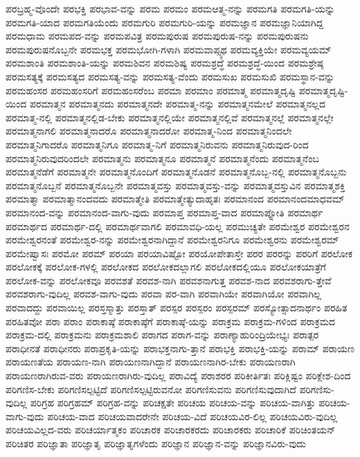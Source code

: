 {ಪರಬ್ರಹ್ಮ-ವೊಂದೇ
ಪರಭಕ್ತಿ
ಪರಭಾವ-ವನ್ನು
ಪರಮ
ಪರಮಂ
ಪರಮಆತ್ಮ-ನನ್ನು
ಪರಮಗತಿ
ಪರಮಗತಿ-ಯನ್ನು
ಪರಮಗತಿ-ಯಾದ
ಪರಮಗತಿಯೆಂದು
ಪರಮಗುರಿ
ಪರಮಗುರಿ-ಯನ್ನು
ಪರಮಜ್ಞಾನ
ಪರಮಜ್ಞಾನಿಯಾಗಿದ್ದ
ಪರಮಧಾಮ
ಪರಮಪದ-ವನ್ನು
ಪರಮಪವಿತ್ರ
ಪರಮಪುರುಷ
ಪರಮಪುರುಷ-ನನ್ನು
ಪರಮಪುರುಷನು
ಪರಮಪುರುಷನೊಬ್ಬನೇ
ಪರಮಭಕ್ತ
ಪರಮಭೋಗಿ-ಗಳಾಗಿ
ಪರಮವಾಪ್ಸ್ಯಥ
ಪರಮವ್ಯಕ್ತಿಯೇ
ಪರಮವ್ಯಯಮ್
ಪರಮಶಾಂತಿ
ಪರಮಶಾಂತಿ-ಯನ್ನು
ಪರಮಶಿವನ
ಪರಮಶಿಷ್ಯ
ಪರಮಶ್ರದ್ಧೆ
ಪರಮಶ್ರದ್ಧೆ-ಯಿಂದ
ಪರಮಶ್ರೇಷ್ಠ
ಪರಮಸತ್ಯಕ್ಕೆ
ಪರಮಸತ್ಯದ
ಪರಮಸತ್ಯ-ವನ್ನು
ಪರಮಸತ್ಯ-ವೆಂದು
ಪರಮಸುಖ
ಪರಮಸುಖಿ
ಪರಮಸ್ಥಾನ-ವನ್ನು
ಪರಮಹಂಸರ
ಪರಮಹಂಸರಿಗೆ
ಪರಮಹಂಸರೆಂಬ
ಪರಮಾ
ಪರಮಾಂ
ಪರಮಾತ್ಮ
ಪರಮಾತ್ಮದೃಷ್ಟಿ
ಪರಮಾತ್ಮದೃಷ್ಟಿ-ಯಿಂದ
ಪರಮಾತ್ಮನ
ಪರಮಾತ್ಮನದು
ಪರಮಾತ್ಮನದೇ
ಪರಮಾತ್ಮ-ನನ್ನು
ಪರಮಾತ್ಮನಮೇಲೆ
ಪರಮಾತ್ಮನಲ್ಲದ
ಪರಮಾತ್ಮ-ನಲ್ಲಿ
ಪರಮಾತ್ಮನಲ್ಲಿಡ-ಬೇಕು
ಪರಮಾತ್ಮನಲ್ಲಿಯೇ
ಪರಮಾತ್ಮನಲ್ಲಿವೆ
ಪರಮಾತ್ಮನಲ್ಲೆ
ಪರಮಾತ್ಮನಲ್ಲೇ
ಪರಮಾತ್ಮನಾಗಲಿ
ಪರಮಾತ್ಮನಾದರೊ
ಪರಮಾತ್ಮನಾದರೋ
ಪರಮಾತ್ಮ-ನಿಂದ
ಪರಮಾತ್ಮನಿಂದಲೇ
ಪರಮಾತ್ಮನಿಗಾದರೊ
ಪರಮಾತ್ಮನಿಗೂ
ಪರಮಾತ್ಮ-ನಿಗೆ
ಪರಮಾತ್ಮನಿರುವನು
ಪರಮಾತ್ಮನಿರುವುದ-ರಿಂದ
ಪರಮಾತ್ಮನಿರುವುದರಿಂದಲೇ
ಪರಮಾತ್ಮನು
ಪರಮಾತ್ಮನೂ
ಪರಮಾತ್ಮನೆ
ಪರಮಾತ್ಮನೆಂದು
ಪರಮಾತ್ಮನೆಂಬ
ಪರಮಾತ್ಮನೆಡೆಗೆ
ಪರಮಾತ್ಮನೇ
ಪರಮಾತ್ಮನೊಂದಿಗೆ
ಪರಮಾತ್ಮನೊಡನೆ
ಪರಮಾತ್ಮನೊಬ್ಬ-ನಲ್ಲಿ
ಪರಮಾತ್ಮನೊಬ್ಬನು
ಪರಮಾತ್ಮನೊಬ್ಬನೆ
ಪರಮಾತ್ಮನೊಬ್ಬನೇ
ಪರಮಾತ್ಮವಸ್ತು
ಪರಮಾತ್ಮವಸ್ತು-ವನ್ನು
ಪರಮಾತ್ಮವಸ್ತುವಿನ
ಪರಮಾತ್ಮಶಕ್ತಿ
ಪರಮಾತ್ಮಾ
ಪರಮಾತ್ಮಾನಂದವದು
ಪರಮಾತ್ಮೇತಿ
ಪರಮಾತ್ಮೇತ್ಯುದಾಹೃತಃ
ಪರಮಾನಂದ
ಪರಮಾನಂದಮಾಧವಮ್
ಪರಮಾನಂದ-ವನ್ನು
ಪರಮಾನಂದ-ವಾಗು-ವುದು
ಪರಮಾಪ್ತ
ಪರಮಾಪ್ತ-ವಾದ
ಪರಮಾಪ್ನೋತಿ
ಪರಮಾರ್ಥ
ಪರಮಾರ್ಥದ
ಪರಮಾರ್ಥ-ದಲ್ಲಿ
ಪರಮಾರ್ಥವಾಗಲಿ
ಪರಮಾವಧಿ-ಯಲ್ಲ
ಪರಮುಚ್ಯತೇ
ಪರಮೇಶ್ವರ
ಪರಮೇಶ್ವರನ
ಪರಮೇಶ್ವರನಂತೆ
ಪರಮೇಶ್ವರ-ನನ್ನು
ಪರಮೇಶ್ವರನಾಗಿದ್ದಾನೆ
ಪರಮೇಶ್ವರನಿಗೂ
ಪರಮೇಶ್ವರನು
ಪರಮೇಶ್ವರಮ್
ಪರಮೇಷ್ವಾಸಃ
ಪರಮೋ
ಪರಮ್
ಪರಯಾ
ಪರಯಾವಿಷ್ಟೋ
ಪರಯೋಪೇತಾಸ್ತೇ
ಪರರ
ಪರರನ್ನು
ಪರರಿಗೆ
ಪರಲೋಕ
ಪರಲೋಕಕ್ಕೆ
ಪರಲೋಕ-ಗಳಲ್ಲಿ
ಪರಲೋಕದ
ಪರಲೋಕದಲ್ಲಾಗಲಿ
ಪರಲೋಕದಲ್ಲಿಯೂ
ಪರಲೋಕಯಾತ್ರೆಗೆ
ಪರಲೋಕ-ವನ್ನು
ಪರಲೋಕವೂ
ಪರವಶತೆ
ಪರವಶ-ನಾಗಿ
ಪರವಶನಾಗುತ್ತ
ಪರವಶ-ನಾದ
ಪರವಶರಾಗು-ತ್ತೇವೆ
ಪರವಶರಾಗು-ವುದಿಲ್ಲ
ಪರವಶ-ವಾಗು-ವುದು
ಪರವಾ
ಪರ-ವಾಗಿ
ಪರವಾಗಿಯೇ
ಪರವಾಗಿಯೋ
ಪರವಾಗಿಲ್ಲ
ಪರವಾದದ್ದು
ಪರವಾಯಿಲ್ಲ
ಪರಸ್ತಸ್ಮಾತ್ತು
ಪರಸ್ತಾತ್
ಪರಸ್ಪರ
ಪರಸ್ಪರಂ
ಪರಸ್ಪರಮ್
ಪರಸ್ಯೋತ್ಸಾದನಾರ್ಥಂ
ಪರಹಿತ
ಪರಹಿತವೋ
ಪರಾ
ಪರಾಂ
ಪರಾಕಾಷ್ಠೆ
ಪರಾಕಾಷ್ಠೆಗೆ
ಪರಾಕಾಷ್ಠೆ-ಯನ್ನು
ಪರಾಕ್ರಮ
ಪರಾಕ್ರಮ-ಗಳಿಂದ
ಪರಾಕ್ರಮದ
ಪರಾಕ್ರಮ-ದಲ್ಲಿ
ಪರಾಕ್ರಮನು
ಪರಾಕ್ರಮಶಾಲಿ
ಪರಾಗದ
ಪರಾಗ-ವನ್ನು
ಪರಾಣ್ಯಾಹುರಿಂದ್ರಿಯೇಭ್ಯಃ
ಪರಾತ್ಪರ
ಪರಾಧೀನತೆ
ಪರಾಧೀನರು
ಪರಾಪ್ರಕೃತಿ-ಯನ್ನು
ಪರಾಭಕ್ತನಾಗು-ತ್ತಾನೆ
ಪರಾಭಕ್ತಿ
ಪರಾಭಕ್ತಿ-ಯನ್ನು
ಪರಾಮ್
ಪರಾಯಣ
ಪರಾಯಣತೆಯ
ಪರಾಯಣ-ನಾಗಿ
ಪರಾಯಣನಾಗಿದ್ದಾನೆ
ಪರಾಯಣನಾಗಿರ-ಬೇಕು
ಪರಾಯಣರಾಗಿ
ಪರಾಯಣರಾಗಿರುವ-ವರು
ಪರಾಯಣರಾಗಿರು-ವುದಿಲ್ಲ
ಪರಾವಿದ್ಯೆ
ಪರಾಶರರ
ಪರಿಕೀರ್ತಿತಃ
ಪರಿಕ್ಲಿಷ್ಟಂ
ಪರಿಕ್ಲೇಶ-ದಿಂದ
ಪರಿಗಣಿಸ-ಬೇಕು
ಪರಿಗಣಿಸಲ್ಪಟ್ಟಿದೆ
ಪರಿಗಣಿಸಲ್ಪಟ್ಟಿರುವನೋ
ಪರಿಗಣಿಸುವನು
ಪರಿಗಣಿಸುವುದಾಗಿದೆ
ಪರಿಗಣಿಸು-ವುದಿಲ್ಲ
ಪರಿಗ್ರಹ
ಪರಿಗ್ರಹಮ್
ಪರಿಗ್ರಹ-ವನ್ನು
ಪರಿಚಕ್ಷತೇ
ಪರಿಚಯ
ಪರಿಚಯ-ವನ್ನು
ಪರಿಚಯ-ವಾಗಿತ್ತು
ಪರಿಚಯ-ವಾಗು-ವುದು
ಪರಿಚಯ-ವಾದ
ಪರಿಚಯವಾದರೇನೇ
ಪರಿಚಯ-ವಿದೆ
ಪರಿಚಯವಿರ-ಲಿಲ್ಲ
ಪರಿಚಯವಿರು-ವುದಿಲ್ಲ
ಪರಿಚಯವಿಲ್ಲದ-ವರು
ಪರಿಚರ್ಯಾತ್ಮಕಂ
ಪರಿಚಾರಕ
ಪರಿಚಾರಕರದು
ಪರಿಚಾರಕರು
ಪರಿಚಾರಿಕೆ
ಪರಿಚಿಂತಯನ್
ಪರಿಚಿತರ
ಪರಿಜ್ಞಾತಾ
ಪರಿಜ್ಞಾತೃ
ಪರಿಜ್ಞಾತೃಗಳೆಂದು
ಪರಿಜ್ಞಾನ
ಪರಿಜ್ಞಾನ-ವನ್ನು
ಪರಿಜ್ಞಾನವಿರು-ವುದು
}
